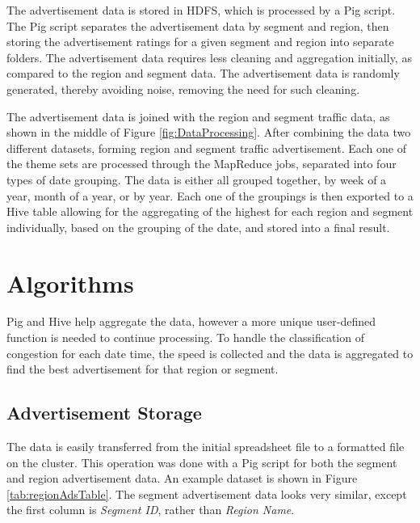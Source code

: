 \documentclass[titlepage,twocolumn]{article}
\begin{document}
\par The advertisement data is stored in HDFS, which is processed by a Pig script. The Pig script separates the advertisement data by segment and region, then storing the advertisement ratings for a given segment and region into separate folders. The advertisement data requires less cleaning and aggregation initially, as compared to the region and segment data. The advertisement data is randomly generated, thereby avoiding noise, removing the need for such cleaning. 

\par The advertisement data is joined with the region and segment traffic data, as shown in the middle of Figure \ref{fig:DataProcessing}. After combining the data two different datasets, forming region and segment traffic advertisement. Each one of the theme sets are processed through the MapReduce jobs, separated into four types of date grouping. The data is either all grouped together, by week of a year, month of a year, or by year. Each one of the groupings is then exported to a Hive table allowing for the aggregating of the highest for each region and segment individually, based on the grouping of the date, and stored into a final result. 

\section{Algorithms}
\label{sec:algorithms}

\par Pig and Hive help aggregate the data, however a more unique user-defined function is needed to continue processing. To handle the classification of congestion for each date time, the speed is collected and the data is aggregated to find the best advertisement for that region or segment.

\subsection{Advertisement Storage}

\par The data is easily transferred from the initial spreadsheet file to a formatted file on the cluster. This operation was done with a Pig script for both the segment and region advertisement data. An example dataset is shown in Figure \ref{tab:regionAdsTable}. The segment advertisement data looks very similar, except the first column is \textit{Segment ID}, rather than \textit{Region Name}. 
\end{document}
